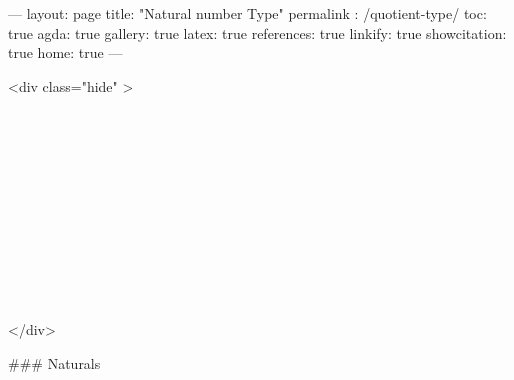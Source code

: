 ---
layout: page
title: "Natural number Type"
permalink : /quotient-type/
toc: true
agda: true
gallery: true
latex: true
references: true
linkify: true
showcitation: true
home: true
---

<div class="hide" >
\begin{code}%
\>[0]\AgdaSymbol{\{-\#}\AgdaSpace{}%
\AgdaSpace{}%
\AgdaSpace{}%
\AgdaSymbol{\#-\}}\<%
\\
\>[0]\AgdaSpace{}%
\AgdaSpace{}%
\<%
\\
\>[0]\AgdaSpace{}%
\AgdaSpace{}%
\<%
\\
%
\\[\AgdaEmptyExtraSkip]%
\>[0]\AgdaSpace{}%
\AgdaSpace{}%
\<%
\\
\>[0]\AgdaSpace{}%
\AgdaSpace{}%
\<%
\\
\>[0]\AgdaSpace{}%
\AgdaSpace{}%
\<%
\\
\>[0]\AgdaSpace{}%
\AgdaSpace{}%
\<%
\\
\>[0]\AgdaSpace{}%
\AgdaSpace{}%
\<%
\\
\>[0]\AgdaSpace{}%
\AgdaSpace{}%
\<%
\\
\>[0]\AgdaSpace{}%
\AgdaSpace{}%
\<%
\end{code}
</div>


### Naturals

